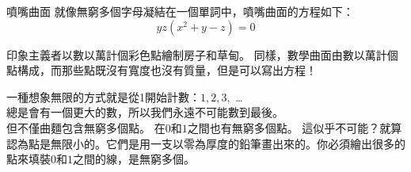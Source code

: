 \begin{surferPage}{噴嘴曲面}
就像無窮多個字母凝結在一個單詞中，噴嘴曲面的方程如下：\\
\smallskip
\[y z (x^2	+ y - z)	= 0\]

\vspace{0.3cm}

印象主義者以數以萬計個彩色點繪制房子和草甸。 同樣，數學曲面由數以萬計個點構成，而那些點既沒有寬度也沒有質量，但是可以寫出方程！\\

\vspace{0.3cm}

一種想象無限的方式就是從1開始計數：$1, 2, 3,$ \dots\\
總是會有一個更大的數，所以我們永遠不可能數到最後。\\

\vspace{0.3cm}
但不僅曲麵包含無窮多個點。 在$0$和$1$之間也有無窮多個點。 這似乎不可能？就算認為點是無限小的。它們是用一支以零為厚度的鉛筆畫出來的。你必須繪出很多的點來填裝$0$和$1$之間的線，是無窮多個。
\end{surferPage}
